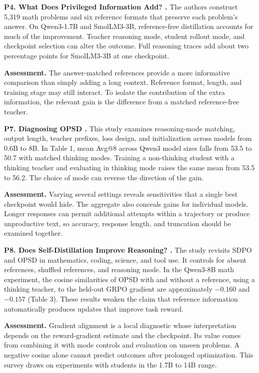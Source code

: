 \documentclass[11pt,a4paper]{article}
\begin{document}
\textbf{P4. What Does Privileged Information Add? \cite{p4}.} The authors construct 5,319 math problems and six reference formats that preserve each problem's answer. On Qwen3-1.7B and SmolLM3-3B, reference-free distillation accounts for much of the improvement. Teacher reasoning mode, student rollout mode, and checkpoint selection can alter the outcome. Full reasoning traces add about two percentage points for SmolLM3-3B at one checkpoint.

\textbf{Assessment.} The answer-matched references provide a more informative comparison than simply adding a long context. Reference format, length, and training stage may still interact. To isolate the contribution of the extra information, the relevant gain is the difference from a matched reference-free teacher.

\textbf{P7. Diagnosing OPSD \cite{p7}.} This study examines reasoning-mode matching, output length, teacher prefixes, loss design, and initialization across models from 0.6B to 8B. In Table 1, mean Avg@8 across Qwen3 model sizes falls from 53.5 to 50.7 with matched thinking modes. Training a non-thinking student with a thinking teacher and evaluating in thinking mode raises the same mean from 53.5 to 56.2. The choice of mode can reverse the direction of the gain.

\textbf{Assessment.} Varying several settings reveals sensitivities that a single best checkpoint would hide. The aggregate also conceals gains for individual models. Longer responses can permit additional attempts within a trajectory or produce unproductive text, so accuracy, response length, and truncation should be examined together.

\textbf{P8. Does Self-Distillation Improve Reasoning? \cite{p8}.} The study revisits SDPO and OPSD in mathematics, coding, science, and tool use. It controls for absent references, shuffled references, and reasoning mode. In the Qwen3-8B math experiment, the cosine similarities of OPSD with and without a reference, using a thinking teacher, to the held-out GRPO gradient are approximately \(-0.160\) and \(-0.157\) (Table 3). These results weaken the claim that reference information automatically produces updates that improve task reward.

\textbf{Assessment.} Gradient alignment is a local diagnostic whose interpretation depends on the reward-gradient estimate and the checkpoint. Its value comes from combining it with mode controls and evaluation on unseen problems. A negative cosine alone cannot predict outcomes after prolonged optimization. This survey draws on experiments with students in the 1.7B to 14B range.
\end{document}
